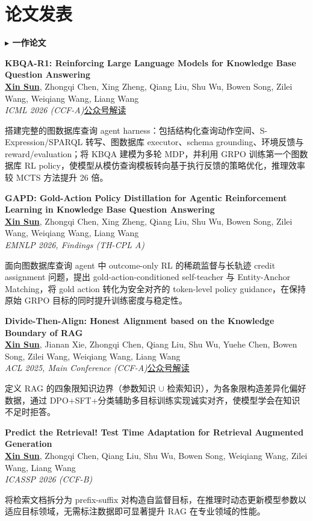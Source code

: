 \documentclass[letterpaper,11pt]{article}
\newcommand{\pubentry}[4]{
  \Needspace{5\baselineskip}
  \item \textbf{#1} \\
  {\small #2} \\
  {\small \textit{#3}\hfill #4}
  \vspace{0pt}
}
\begin{document}
\section{论文发表}

\textbf{\color{primary} $\blacktriangleright$ \quad 一作论文}
\begin{enumerate}[leftmargin=0.3in, label={[\arabic*]}, itemsep=4pt, parsep=0pt, topsep=4pt]

  \pubentry{KBQA-R1: Reinforcing Large Language Models for Knowledge Base Question Answering}
  {\textbf{\underline{Xin Sun}}, Zhongqi Chen, Xing Zheng, Qiang Liu, Shu Wu, Bowen Song, Zilei Wang, Weiqiang Wang, Liang Wang}
  {ICML 2026 (CCF-A)}{\href{https://mp.weixin.qq.com/s/ZydIkuX27NxSTOKCQTU_vw}{公众号解读}\quad}
  {\small\color{secondary} 搭建完整的图数据库查询 agent harness：包括结构化查询动作空间、S-Expression/SPARQL 转写、图数据库 executor、schema grounding、环境反馈与 reward/evaluation；将 KBQA 建模为多轮 MDP，并利用 GRPO 训练第一个图数据库 RL policy，使模型从模仿查询模板转向基于执行反馈的策略优化，推理效率较 MCTS 方法提升 26 倍。}

  \pubentry{GAPD: Gold-Action Policy Distillation for Agentic Reinforcement Learning in Knowledge Base Question Answering}
  {\textbf{\underline{Xin Sun}}, Zhongqi Chen, Xing Zheng, Qiang Liu, Shu Wu, Bowen Song, Zilei Wang, Weiqiang Wang, Liang Wang}
  {EMNLP 2026, Findings (TH-CPL A)}{}
  {\small\color{secondary} 面向图数据库查询 agent 中 outcome-only RL 的稀疏监督与长轨迹 credit assignment 问题，提出 gold-action-conditioned self-teacher 与 Entity-Anchor Matching，将 gold action 转化为安全对齐的 token-level policy guidance，在保持原始 GRPO 目标的同时提升训练密度与稳定性。}

  \pubentry{Divide-Then-Align: Honest Alignment based on the Knowledge Boundary of RAG}
  {\textbf{\underline{Xin Sun}}, Jianan Xie, Zhongqi Chen, Qiang Liu, Shu Wu, Yuehe Chen, Bowen Song, Zilei Wang, Weiqiang Wang, Liang Wang}
  {ACL 2025, Main Conference (CCF-A)}{\href{https://mp.weixin.qq.com/s/bBKgZvC7Gnj-v3RNBCzBXw}{公众号解读}\quad}
  {\small\color{secondary} 定义 RAG 的四象限知识边界（参数知识 $\cup$ 检索知识），为各象限构造差异化偏好数据，通过 DPO+SFT+分类辅助多目标训练实现诚实对齐，使模型学会在知识不足时拒答。}

  \pubentry{Predict the Retrieval! Test Time Adaptation for Retrieval Augmented Generation}
  {\textbf{\underline{Xin Sun}}, Zhongqi Chen, Qiang Liu, Shu Wu, Bowen Song, Weiqiang Wang, Zilei Wang, Liang Wang}
  {ICASSP 2026 (CCF-B)}{}
  {\small\color{secondary} 将检索文档拆分为 prefix-suffix 对构造自监督目标，在推理时动态更新模型参数以适应目标领域，无需标注数据即可显著提升 RAG 在专业领域的性能。}


\end{enumerate}
\end{document}
